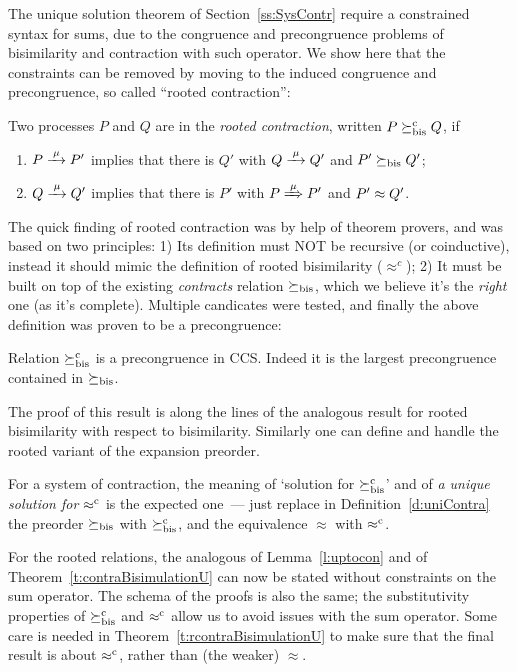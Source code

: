 The unique solution theorem of Section~\ref{ss:SysContr} require a
constrained syntax for sums, due to the congruence and precongruence
problems of bisimilarity and contraction with such operator. 
We show here that the constraints can be
removed by moving to the induced congruence and precongruence, so
called ``rooted contraction'':
\begin{definition}
\label{d:rcontra}
Two processes $P$ and $Q$ are in the \emph{rooted contraction}, written 
 $P\mathrel{\succeq^{\rm{c}}_{\rm{bis}}} Q$, if
\begin{enumerate}
\item $P \arr\mu P'$ implies that there is $Q'$ with $Q \arr \mu Q'$
 and $P'\mathrel{\succeq_{\rm{bis}}} Q'$;
\item $Q \arr\mu Q'$   implies that there is $P'$ with $P \Arr \mu
 P'$ and $P' \approx Q'$.
\end{enumerate}
\end{definition}

The quick finding of rooted contraction was by help of
theorem provers, and was based on two principles: 1) Its definition must NOT be recursive
(or coinductive), instead it should mimic the definition of rooted bisimilarity
($\approx^c$); 2) It must be built on top of the existing \emph{contracts}
relation $\mathrel{\succeq_{\rm{bis}}}$, which we believe it's the \emph{right} one (as
it's complete). Multiple candicates were tested, and finally the above
definition was proven to be a precongruence:
\begin{theorem}
\label{t:rcontrPrecongruence}
Relation $\mathrel{\succeq^{\rm{c}}_{\rm{bis}}}$ is a precongruence in CCS.  Indeed it is the
largest precongruence contained in $\mathrel{\succeq_{\rm{bis}}}$.
\end{theorem}  
The proof of this result is along the lines of the analogous result
for rooted bisimilarity with respect to bisimilarity. 
Similarly one can define and handle the rooted variant of the expansion preorder. 

For a system of contraction, the meaning of 
`solution  for $\mathrel{\succeq^{\rm{c}}_{\rm{bis}}}$' and of 
 \emph{a unique 
solution for $\mathrel{\approx^{\rm{c}}}$}
is the expected one~--- just replace in Definition~\ref{d:uniContra}  the preorder 
$\mathrel{\succeq_{\rm{bis}}}$ with $\mathrel{\succeq^{\rm{c}}_{\rm{bis}}}$, and the equivalence 
$\approx$ with $\mathrel{\approx^{\rm{c}}}$.

For the rooted relations, the analogous of Lemma~\ref{l:uptocon} and of
Theorem~\ref{t:contraBisimulationU} can now be stated without constraints on the sum
operator.  
The schema of the proofs is also the same; the substitutivity
properties of 
$\mathrel{\succeq^{\rm{c}}_{\rm{bis}}}$ and $\mathrel{\approx^{\rm{c}}}$ allow us to avoid issues with the sum
operator. Some care is needed in Theorem~\ref{t:rcontraBisimulationU}
to make sure that the final result is about  
$\mathrel{\approx^{\rm{c}}}$, rather than (the weaker) $\approx$.


